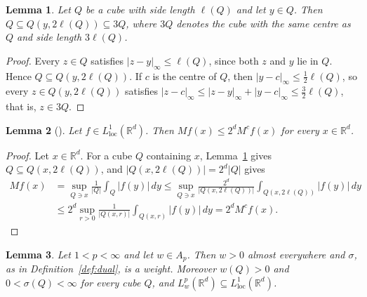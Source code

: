 \documentclass[12pt]{article}
\newtheorem{lemma}{Lemma}
\begin{document}
\begin{lemma}\label{lem:cubes}
Let $Q$ be a cube with side length $\ell(Q)$ and let $y \in Q$. Then $Q \subseteq Q(y, 2\ell(Q)) \subseteq 3Q$, where $3Q$ denotes the cube with the same centre as $Q$ and side length $3\ell(Q)$.
\end{lemma}

\begin{proof}
Every $z \in Q$ satisfies $|z - y|_\infty \le \ell(Q)$, since both $z$ and $y$ lie in $Q$. Hence $Q \subseteq Q(y, 2\ell(Q))$. If $c$ is the centre of $Q$, then $|y - c|_\infty \le \frac{1}{2}\ell(Q)$, so every $z \in Q(y, 2\ell(Q))$ satisfies $|z - c|_\infty \le |z - y|_\infty + |y - c|_\infty \le \frac{3}{2}\ell(Q)$, that is, $z \in 3Q$.
\end{proof}

\begin{lemma}[{\cite[Section~2.1.1]{GrafakosClassical}}]\label{lem:centred}
Let $f \in L^1_{\mathrm{loc}}(\mathbb{R}^d)$. Then $Mf(x) \le 2^d M^c f(x)$ for every $x \in \mathbb{R}^d$.
\end{lemma}

\begin{proof}
Let $x \in \mathbb{R}^d$. For a cube $Q$ containing $x$, Lemma~\ref{lem:cubes} gives $Q \subseteq Q(x, 2\ell(Q))$, and $|Q(x, 2\ell(Q))| = 2^d |Q|$ gives
\begin{align*}
  Mf(x) &= \sup_{Q \ni x} \frac{1}{|Q|} \int_Q |f(y)|\,dy \le \sup_{Q \ni x} \frac{2^d}{|Q(x, 2\ell(Q))|} \int_{Q(x, 2\ell(Q))} |f(y)|\,dy \\
  &\le 2^d \sup_{r > 0} \frac{1}{|Q(x, r)|} \int_{Q(x, r)} |f(y)|\,dy = 2^d M^c f(x).
\end{align*}
\end{proof}

\begin{lemma}\label{lem:sigma}
Let $1 < p < \infty$ and let $w \in A_p$. Then $w > 0$ almost everywhere and $\sigma$, as in Definition~\ref{def:dual}, is a weight. Moreover $w(Q) > 0$ and $0 < \sigma(Q) < \infty$ for every cube $Q$, and $L^p_w(\mathbb{R}^d) \subseteq L^1_{\mathrm{loc}}(\mathbb{R}^d)$.
\end{lemma}
\end{document}
